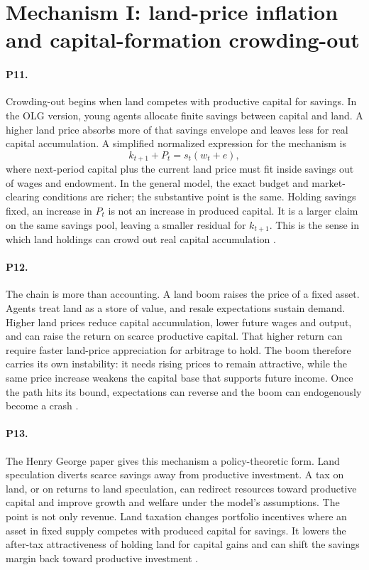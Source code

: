 \documentclass[11pt]{article}
\begin{document}
\section{Mechanism I: land-price inflation and capital-formation crowding-out}

\paragraph{P11.} Crowding-out begins when land competes with productive capital for savings. In the OLG version, young agents allocate finite savings between capital and land. A higher land price absorbs more of that savings envelope and leaves less for real capital accumulation. A simplified normalized expression for the mechanism is
\[
  k_{t+1}+P_t=s_t(w_t+e),
\]
where next-period capital plus the current land price must fit inside savings out of wages and endowment. In the general model, the exact budget and market-clearing conditions are richer; the substantive point is the same. Holding savings fixed, an increase in \(P_t\) is not an increase in produced capital. It is a larger claim on the same savings pool, leaving a smaller residual for \(k_{t+1}\). This is the sense in which land holdings can crowd out real capital accumulation \citep[pp.~7, 24, 46--47]{hiranoStiglitz2022LandSpeculation}.

\paragraph{P12.} The chain is more than accounting. A land boom raises the price of a fixed asset. Agents treat land as a store of value, and resale expectations sustain demand. Higher land prices reduce capital accumulation, lower future wages and output, and can raise the return on scarce productive capital. That higher return can require faster land-price appreciation for arbitrage to hold. The boom therefore carries its own instability: it needs rising prices to remain attractive, while the same price increase weakens the capital base that supports future income. Once the path hits its bound, expectations can reverse and the boom can endogenously become a crash \citep[pp.~7, 24, 46--47]{hiranoStiglitz2022LandSpeculation}.

\paragraph{P13.} The Henry George paper gives this mechanism a policy-theoretic form. Land speculation diverts scarce savings away from productive investment. A tax on land, or on returns to land speculation, can redirect resources toward productive capital and improve growth and welfare under the model's assumptions. The point is not only revenue. Land taxation changes portfolio incentives where an asset in fixed supply competes with produced capital for savings. It lowers the after-tax attractiveness of holding land for capital gains and can shift the savings margin back toward productive investment \citep[pp.~327, 329, 335, 345]{hiranoStiglitz2025HenryGeorge}.
\end{document}
